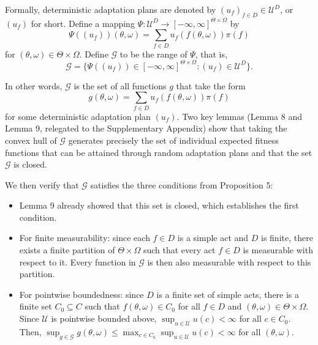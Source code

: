 \documentclass[12pt,a4paper]{article}
\newenvironment{original}
  {\par\noindent\color{black}\smallskip}
  {\par\smallskip}
\begin{document}
\begin{original}
Formally, deterministic adaptation plans are denoted by $(u_f)_{f \in D} \in \mathcal{U}^D$, or $(u_f)$ for short. Define a mapping $\Psi: \mathcal{U}^D \to [-\infty, \infty]^{\Theta \times \Omega}$ by
\[
\Psi((u_f))(\theta, \omega) = \sum_{f \in D} u_f(f(\theta, \omega)) \pi(f)
\]
for $(\theta, \omega) \in \Theta \times \Omega$. Define $\mathcal{G}$ to be the range of $\Psi$, that is,
\[
\mathcal{G} = \{ \Psi((u_f)) \in [-\infty, \infty]^{\Theta \times \Omega} : (u_f) \in \mathcal{U}^D \}.
\]

In other words, $\mathcal{G}$ is the set of all functions $g$ that take the form
\[
g(\theta, \omega) = \sum_{f \in D} u_f(f(\theta, \omega)) \pi(f)
\]
for some deterministic adaptation plan $(u_f)$. Two key lemmas (Lemma 8 and Lemma 9, relegated to the Supplementary Appendix) show that taking the convex hull of $\mathcal{G}$ generates precisely the set of individual expected fitness functions that can be attained through random adaptation plans and that the set $\mathcal{G}$ is closed.

We then verify that $\mathcal{G}$ satisfies the three conditions from Proposition 5:
\begin{itemize}
\item Lemma 9 already showed that this set is closed, which establishes the first condition.
\item For finite measurability: since each $f \in D$ is a simple act and $D$ is finite, there exists a finite partition of $\Theta \times \Omega$ such that every act $f \in D$ is measurable with respect to it. Every function in $\mathcal{G}$ is then also measurable with respect to this partition.
\item For pointwise boundedness: since $D$ is a finite set of simple acts, there is a finite set $C_0 \subseteq C$ such that $f(\theta, \omega) \in C_0$ for all $f \in D$ and $(\theta, \omega) \in \Theta \times \Omega$. Since $\mathcal{U}$ is pointwise bounded above, $\sup_{u \in \mathcal{U}} u(c) < \infty$ for all $c \in C_0$. Then, $\sup_{g \in \mathcal{G}} g(\theta, \omega) \leq \max_{c \in C_0} \sup_{u \in \mathcal{U}} u(c) < \infty$ for all $(\theta, \omega)$.
\end{itemize}


\end{original}
\end{document}

